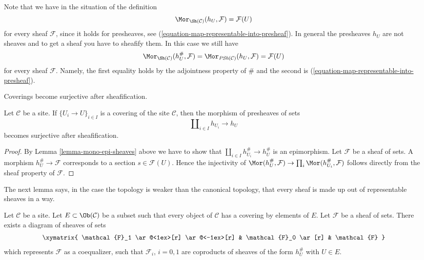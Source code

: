 \noindent
Note that we have in the situation of the definition
$$
\Mor_{\Sh(\mathcal{C})}(h_U, \mathcal{F}) = \mathcal{F}(U)
$$
for every sheaf $\mathcal{F}$, since it holds for presheaves, see
(\ref{equation-map-representable-into-presheaf}). In general the
presheaves $h_U$ are not sheaves and to get a sheaf you have to
sheafify them. In this case we still have
\begin{equation}
\label{equation-map-representable-into-sheaf}
\Mor_{\Sh(\mathcal{C})}(h_U^\#, \mathcal{F}) =
\Mor_{\textit{PSh}(\mathcal{C})}(h_U, \mathcal{F}) =
\mathcal{F}(U)
\end{equation}
for every sheaf $\mathcal{F}$. Namely, the first equality holds
by the adjointness property of $\#$ and the second is
(\ref{equation-map-representable-into-presheaf}).

\begin{lemma}
\label{lemma-covering-surjective-after-sheafification}
\begin{slogan}
Coverings become surjective after sheafification.
\end{slogan}
Let $\mathcal{C}$ be a site. If
$\{U_i \to U\}_{i \in I}$ is a covering of the site
$\mathcal{C}$, then the morphism of presheaves of sets
$$
\coprod\nolimits_{i \in I} h_{U_i} \to h_U
$$
becomes surjective after sheafification.
\end{lemma}

\begin{proof}
By Lemma \ref{lemma-mono-epi-sheaves} above we have to show that
$\coprod\nolimits_{i \in I} h_{U_i}^\# \to h_U^\#$
is an epimorphism. Let $\mathcal{F}$ be a sheaf of sets.
A morphism $h_U^\# \to \mathcal{F}$
corresponds to a section $s \in \mathcal{F}(U)$.
Hence the injectivity of $\Mor(h_U^\#, \mathcal{F})
\to \prod_i \Mor(h_{U_i}^\#, \mathcal{F})$ follows
directly from the sheaf property of $\mathcal{F}$.
\end{proof}

\noindent
The next lemma says, in the case the topology is weaker than the
canonical topology, that every sheaf is made up out of
representable sheaves in a way.

\begin{lemma}
\label{lemma-sheaf-coequalizer-representable}
Let $\mathcal{C}$ be a site. Let $E \subset \Ob(\mathcal{C})$ be a
subset such that every object of $\mathcal{C}$ has a covering by
elements of $E$. Let $\mathcal{F}$ be a sheaf of sets. There exists a
diagram of sheaves of sets
$$
\xymatrix{
\mathcal{F}_1 \ar@<1ex>[r] \ar@<-1ex>[r] &
\mathcal{F}_0 \ar[r] &
\mathcal{F}
}
$$
which represents $\mathcal{F}$ as a coequalizer,
such that $\mathcal{F}_i$, $i = 0, 1$ are coproducts
of sheaves of the form $h_U^\#$ with $U \in E$.
\end{lemma}

